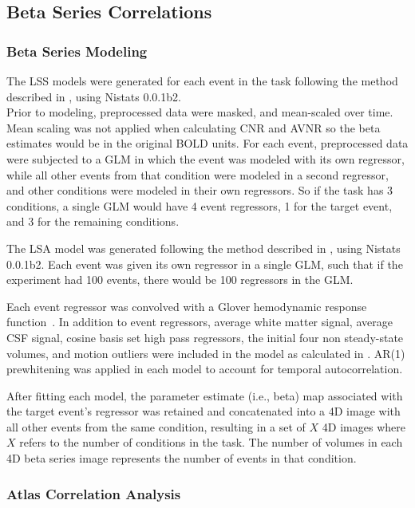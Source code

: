 \documentclass[phd,figures,tables,ackpage,abstractpage,publicabstractpage]{uithesis}
\begin{document}
\subsection{Beta Series Correlations}
\label{methods:bsc}

\subsubsection{Beta Series Modeling}
\label{methods:bsc_model}

The LSS models were generated for each event in
the task following the method described in \cite[Turner (2012)]{Turner2012a}, using
Nistats 0.0.1b2.\\
Prior to modeling, preprocessed data were masked, and mean-scaled over
time.
Mean scaling was not applied when calculating CNR and AVNR so the
beta estimates would be in the original BOLD units.
For each event, preprocessed data were subjected to a GLM
in which the event was modeled with its own regressor, while
all other events from that condition were modeled in a second regressor,
and other conditions were modeled in their own regressors.
So if the task has 3 conditions, 
a single GLM would have 4 event regressors, 1 for the target
event, and 3 for the remaining conditions.

The LSA model was generated following the method described in
\cite[Rissman (2004)]{Rissman2004}, using Nistats 0.0.1b2.
Each event was given its own regressor in a single GLM, such that
if the experiment had 100 events, there would be 100 regressors in the GLM.

Each event regressor was convolved with a Glover hemodynamic response
function~\cite{Glover1999}.
In addition to event regressors, average white matter signal, average CSF signal,
cosine basis set high pass regressors, the initial four non steady-state volumes, 
and motion outliers were included
in the model as calculated in .
AR(1) prewhitening was applied in each model to account
for temporal autocorrelation.

After fitting each model, the parameter estimate (i.e., beta) map
associated with the target event's regressor was retained and
concatenated into a 4D image with all other events from the same
condition, resulting in a set of $X$ 4D images where $X$ refers to the
number of conditions in the task.
The number of volumes in each 4D beta series image
represents the number of events in that condition.

\subsubsection{Atlas Correlation Analysis}
\label{methods:atlas-corr-analysis}
\end{document}

